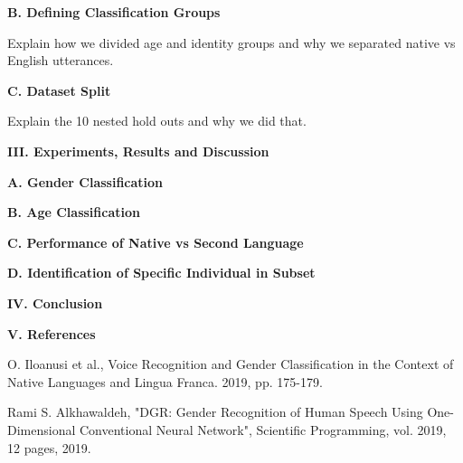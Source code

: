 \documentclass{article}
\begin{document}
\vspace{2mm}
\textbf{ B. Defining Classification Groups }\par
Explain how we divided age and identity groups and why we separated native vs English utterances. 

\vspace{2mm}
\textbf{ C. Dataset Split }\par
Explain the 10 nested hold outs and why we did that.

\vspace{2mm}
\textbf{III. Experiments, Results and Discussion }\par

\vspace{2mm}
\textbf{ A. Gender Classification }\par

\vspace{2mm}
\textbf{ B. Age Classification }\par

\vspace{2mm}
\textbf{ C. Performance of Native vs Second Language }\par

\vspace{2mm}
\textbf{ D. Identification of Specific Individual in Subset }\par

\vspace{2mm}
\textbf{IV. Conclusion }\par


\vspace{2mm}
\textbf{V. References}\par
[1]	O. Iloanusi et al., Voice Recognition and Gender Classification in the Context of Native Languages and Lingua Franca. 2019, pp. 175-179.\par
[2] Rami S. Alkhawaldeh, "DGR: Gender Recognition of Human Speech Using One-Dimensional Conventional Neural Network", Scientific Programming, vol. 2019, 12 pages, 2019.
\end{document}
